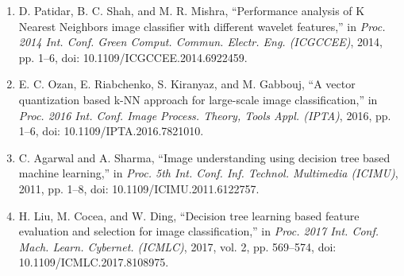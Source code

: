 \documentclass[12pt,a4paper]{report}
\begin{document}
\begin{enumerate}
	\item D. Patidar, B. C. Shah, and M. R. Mishra, ``Performance analysis of K Nearest Neighbors image classifier with different wavelet features,'' in \textit{Proc. 2014 Int. Conf. Green Comput. Commun. Electr. Eng. (ICGCCEE)}, 2014, pp. 1--6, doi: 10.1109/ICGCCEE.2014.6922459.
	\item E. C. Ozan, E. Riabchenko, S. Kiranyaz, and M. Gabbouj, ``A vector quantization based k-NN approach for large-scale image classification,'' in \textit{Proc. 2016 Int. Conf. Image Process. Theory, Tools Appl. (IPTA)}, 2016, pp. 1--6, doi: 10.1109/IPTA.2016.7821010.
	\item C. Agarwal and A. Sharma, ``Image understanding using decision tree based machine learning,'' in \textit{Proc. 5th Int. Conf. Inf. Technol. Multimedia (ICIMU)}, 2011, pp. 1--8, doi: 10.1109/ICIMU.2011.6122757.
	\item H. Liu, M. Cocea, and W. Ding, ``Decision tree learning based feature evaluation and selection for image classification,'' in \textit{Proc. 2017 Int. Conf. Mach. Learn. Cybernet. (ICMLC)}, 2017, vol. 2, pp. 569--574, doi: 10.1109/ICMLC.2017.8108975.
\end{enumerate}
	
\end{document}
